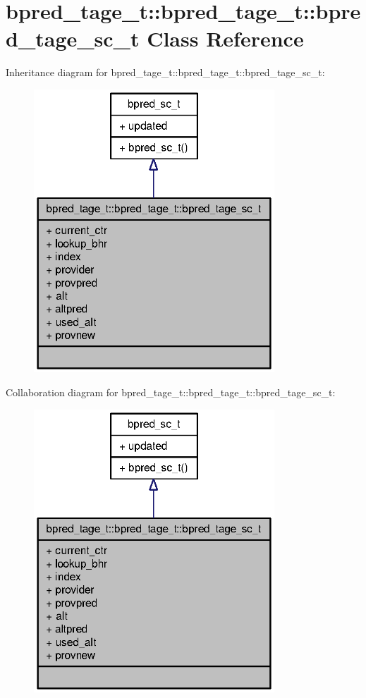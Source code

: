 \section{bpred\_\-tage\_\-t::bpred\_\-tage\_\-t::bpred\_\-tage\_\-sc\_\-t Class Reference}
\label{classbpred__tage__t_1_1bpred__tage__sc__t}
Inheritance diagram for bpred\_\-tage\_\-t::bpred\_\-tage\_\-t::bpred\_\-tage\_\-sc\_\-t:\nopagebreak
\begin{figure}[H]
\begin{center}
\leavevmode
\includegraphics[width=256pt]{classbpred__tage__t_1_1bpred__tage__sc__t__inherit__graph}
\end{center}
\end{figure}
Collaboration diagram for bpred\_\-tage\_\-t::bpred\_\-tage\_\-t::bpred\_\-tage\_\-sc\_\-t:\nopagebreak
\begin{figure}[H]
\begin{center}
\leavevmode
\includegraphics[width=256pt]{classbpred__tage__t_1_1bpred__tage__sc__t__coll__graph}
\end{center}
\end{figure}
